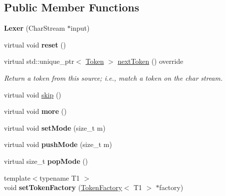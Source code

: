 \subsection*{Public Member Functions}
\begin{DoxyCompactItemize}
\item 
\mbox{\label{classantlr4_1_1Lexer_a50dfaabfae86f4e1c763f7c445ba9f92}} 
{\bfseries Lexer} (Char\+Stream $\ast$input)
\item 
\mbox{\label{classantlr4_1_1Lexer_a7cd677de562c09e51eed558b86e79ca0}} 
virtual void {\bfseries reset} ()
\item 
\mbox{\label{classantlr4_1_1Lexer_a50ac15500fabb9c3fee8d23af11fdc02}} 
virtual std\+::unique\+\_\+ptr$<$ \hyperlink{classantlr4_1_1Token}{Token} $>$ \hyperlink{classantlr4_1_1Lexer_a50ac15500fabb9c3fee8d23af11fdc02}{next\+Token} () override
\begin{DoxyCompactList}\small\item\em Return a token from this source; i.\+e., match a token on the char stream. \end{DoxyCompactList}\item 
virtual void \hyperlink{classantlr4_1_1Lexer_a8d2585d70adce01584a505a25c3e179d}{skip} ()
\item 
\mbox{\label{classantlr4_1_1Lexer_a772eaf78c4625988ae9feee1a703c655}} 
virtual void {\bfseries more} ()
\item 
\mbox{\label{classantlr4_1_1Lexer_a703b8addb4dcdc4f0b813b30b29fff39}} 
virtual void {\bfseries set\+Mode} (size\+\_\+t m)
\item 
\mbox{\label{classantlr4_1_1Lexer_aa950f0befa665795ac3cd25364276cb8}} 
virtual void {\bfseries push\+Mode} (size\+\_\+t m)
\item 
\mbox{\label{classantlr4_1_1Lexer_a6ab6c5e749d1e6491bc9afaa194253e9}} 
virtual size\+\_\+t {\bfseries pop\+Mode} ()
\item 
\mbox{\label{classantlr4_1_1Lexer_a58a025200d7cef993c039038bb7fd0c6}} 
{\footnotesize template$<$typename T1 $>$ }\\void {\bfseries set\+Token\+Factory} (\hyperlink{classantlr4_1_1TokenFactory}{Token\+Factory}$<$ T1 $>$ $\ast$factory)

\end{DoxyCompactItemize}
